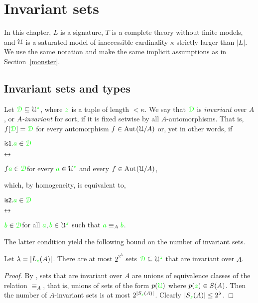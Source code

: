 \chapter{Invariant sets}
\label{invariant}

\def\medrel#1{\parbox[t]{5ex}{$\displaystyle\hfil #1$}}
\def\ceq#1#2#3{\parbox[t]{19ex}{$\displaystyle #1$}\medrel{#2}{$\displaystyle #3$}}

In this chapter, $L$ is a signature, $T$ is a complete theory without finite models, and $\EuScript U$ is a saturated model of inaccessible cardinality $\kappa$ strictly larger than $|L|$.
We use the same notation and make the same implicit assumptions as in Section~\ref{monster}.

\section{Invariant sets and types}\label{invariant_sets}

Let ${\color{green}\EuScript D}\subseteq\EuScript U^{\color{green} z}$, where ${\color{green} z}$ is a tuple of length $<\kappa$.
We say that ${\color{green}\EuScript D}$ is \emph{invariant\/} over $A$, or \emph{$A$-invariant\/} for sort, if it is fixed setwise by all $A$-automorphisms.
That is, $f[{\color{green}\EuScript D}]={\color{green}\EuScript D}$ for every automorphism $f\in{\rm Aut\kern.15ex}(\EuScript U/A)$ or, yet in other words, if

\ceq{\ssf{is1.}\hfill {\gr a}\in\grD}{\iff}{f{\gr a}\in\grD}\hfill for every ${\color{green} a}\in\EuScript U^{\color{green} z}$ and every $f\in{\rm Aut\kern.15ex}(\EuScript U/A)$,

which, by homogeneity, is equivalent to,

\ceq{\ssf{is2.}\hfill {\gr a}\in\grD}{\iff}{{\gr b}\in\grD}\hfill for all ${\color{green} a},{\color{green} b}\in\EuScript U^{\color{green} z}$ such that ${\color{green} a}\equiv_A{\color{green} b}$.

The latter condition yield the following bound on the number of invariant sets.

\begin{proposition}\label{prop_numberIS}
Let $\lambda=|L_{\color{green} z}(A)|$.
There are at most $2^{2^{\lambda}}$ sets ${\color{green}\EuScript D}\subseteq\EuScript U^{\color{green} z}$ that are invariant over $A$.
\end{proposition}
\begin{proof}
By , sets that are invariant over $A$ are unions of equivalence classes of the relation $\equiv_A$, that is, unions of sets of the form $p({\color{green}\EuScript U})$ where $p({\color{green} z})\in S(A)$.
Then the number of $A$-invariant sets is at most $2^{|S_{\color{green} z}(A)|}$.
Clearly $|S_{\color{green} z}(A)|\le 2^\lambda$.
\end{proof} 

